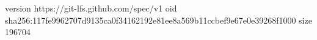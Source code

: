 version https://git-lfs.github.com/spec/v1
oid sha256:117fe9962707d9135ca0f34162192e81ee8a569b11ccbef9e67e0e39268f1000
size 196704
